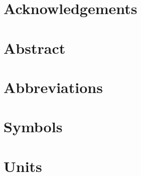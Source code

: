 \documentclass[a4paper,10pt, twoside]{article}
\begin{document}
    
    
    \pagestyle{plain}
    
    \cleardoublepage
    
    

    \vspace*{\fill}
    \begingroup
        \section*{Acknowledgements}
        
    \endgroup
    \vspace*{\fill}
    \cleardoublepage
    
    

    \section*{Abstract}\label{sec:abstract}
        
        
    \cleardoublepage

    
    \begingroup
        \section*{Abbreviations}\label{sec:abbreviations}
            
    \endgroup
    \clearpage


    \begingroup
        \section*{Symbols}\label{sec:symbols}
            
    \endgroup
    \clearpage
    
    
    \begingroup
        \section*{Units}\label{sec:units}
            
    \endgroup
    \cleardoublepage
    
\end{document}

